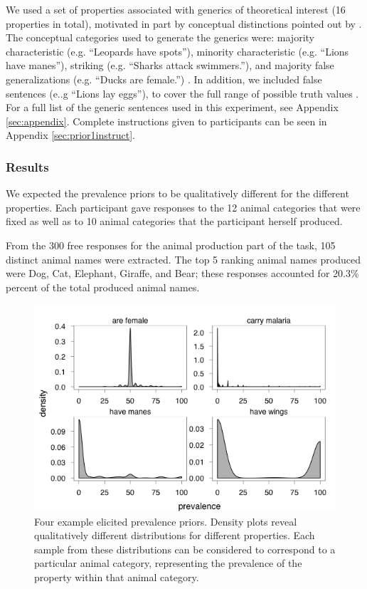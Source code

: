 \documentclass[10pt,letterpaper]{article}
\begin{document}
We used a set of properties associated with generics of theoretical interest (16 properties in total), motivated in part by conceptual distinctions pointed out by . 
The conceptual categories used to generate the generics were: majority characteristic (e.g. ``Leopards have spots''), minority characteristic (e.g. ``Lions have manes''), striking (e.g. ``Sharks attack swimmers.''), and majority false generalizations (e.g. ``Ducks are female.'') \cite{Prasada2013}. In addition, we included false sentences (e..g ``Lions lay eggs''), to cover the full range of possible truth values .
For a full list of the generic sentences used in this experiment, see Appendix \ref{sec:appendix}.
Complete instructions given to participants can be seen in Appendix \ref{sec:prior1instruct}.





\subsubsection{Results}

We expected the prevalence priors to be qualitatively different for the different properties. Each participant gave responses to the 12 animal categories that were fixed as well as to 10 animal categories that the participant herself produced. 

From the 300 free responses for the animal production part of the task, 105 distinct animal names were extracted. The top 5 ranking animal names produced were Dog, Cat, Elephant, Giraffe, and Bear; these responses accounted for 20.3\% percent of the total produced animal names.

\begin{figure}
\centering
    \includegraphics[width=0.8\columnwidth]{priors-exp1a-4types}
    \caption{Four example elicited prevalence priors. Density plots reveal qualitatively different distributions for different properties. Each sample from these distributions can be considered to correspond to a particular animal category, representing the prevalence of the property within that animal category.}
  \label{fig:priors1a}
\end{figure}
\end{document}
